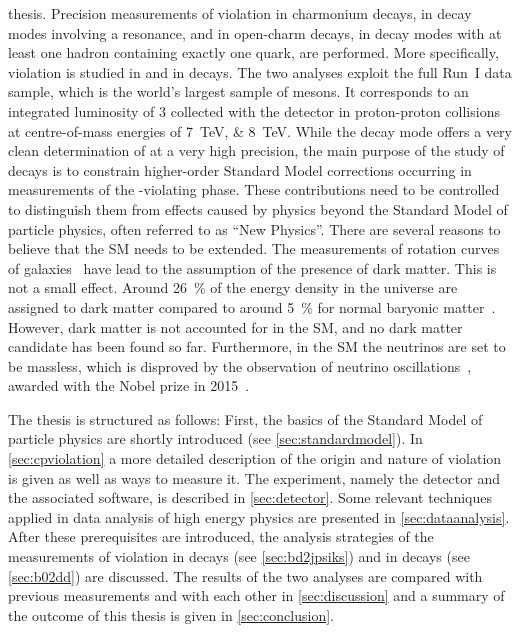 thesis. Precision measurements of \CP violation in charmonium decays, \ie in
decay modes involving a \ccbar resonance, and in open-charm decays, \ie in
decay modes with at least one hadron containing exactly one \cquark quark, are
performed. More specifically, \CP violation is studied in \BdToJPsiKS and in
\BdToDD decays. The two analyses exploit the full Run~I data sample, which is
the world's largest sample of \Bz mesons. It corresponds to an integrated
luminosity of \SI{3}{\invfb} collected with the \lhcb detector in
proton-proton collisions at centre-of-mass energies of \SIlist{7;8}{\TeV}.
While the decay mode \BdToJPsiKS offers a very clean determination of
\sintwobeta at a very high precision, the main purpose of the study of \BdToDD
decays is to constrain higher-order Standard Model corrections occurring in
measurements of the \CP-violating phase. These contributions need to be
controlled to distinguish them from effects caused by physics beyond the
Standard Model of particle physics, often referred to as \enquote{New Physics}. There
are several reasons to believe that the SM needs to be extended. The
measurements of rotation curves of galaxies~\cite{AndromedaNebula} have lead
to the assumption of the presence of dark matter. This is not a small effect.
Around \SI{26}{\percent} of the energy density in the universe are assigned to
dark matter compared to around \SI{5}{\percent} for normal baryonic
matter~\cite{Ade:2015xua}. However, dark matter is not accounted for in the
SM, and no dark matter candidate has been found so far. Furthermore, in the
SM the neutrinos are set to be massless, which is disproved by the observation
of neutrino oscillations~\cite{Fukuda:1998mi,Ahmad:2001an,*Ahmad:2002jz},
awarded with the Nobel prize in 2015~\cite{NobelPrize2015}.

The thesis is structured as follows: First, the basics of the
Standard Model of particle physics are shortly introduced (see
\cref{sec:standardmodel}). In \cref{sec:cpviolation} a more detailed
description of the origin and nature of \CP violation is given as well as ways
to measure it. The \lhcb experiment, namely the detector and the associated
software, is described in \cref{sec:detector}. Some relevant techniques
applied in data analysis of high energy physics are presented in
\cref{sec:dataanalysis}. After these prerequisites are introduced, the analysis
strategies of the measurements of \CP violation in \BdToJPsiKS decays (see
\cref{sec:bd2jpsiks}) and in \BdToDD decays (see \cref{sec:b02dd}) are
discussed. The results of the two analyses are compared with previous
measurements and with each other in \cref{sec:discussion} and a summary of the
outcome of this thesis is given in \cref{sec:conclusion}.
